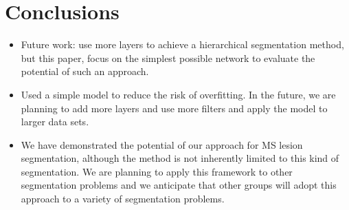 \section{Conclusions}

\begin{itemize}
\item Future work: use more layers to achieve a hierarchical segmentation
method, but this paper, focus on the simplest possible network to evaluate the
potential of such an approach.
\item Used a simple model to reduce the risk of overfitting. In the future, we
are planning to add more layers and use more filters and apply the model to
larger data sets.
\item We have demonstrated the potential of our approach for MS lesion
segmentation, although the method is not inherently limited to this kind of
segmentation. We are planning to apply this framework to other segmentation
problems and we anticipate that other groups will adopt this approach to a
variety of segmentation problems.
\end{itemize}

